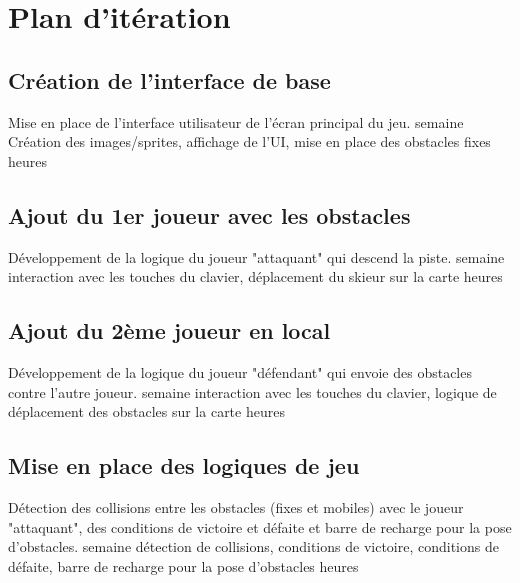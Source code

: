 \documentclass[a4paper,11pt]{article}
\begin{document}
	\newpage
	\section{Plan d'itération}
	
		\subsection{Création de l'interface de base}
			\begin{enumerate}[labelwidth=5em,leftmargin=8em]
				\objectif Mise en place de l'interface utilisateur de l'écran principal du jeu.
				 semaine
				\partageTache Création des images/sprites, affichage de l'UI, mise en place des obstacles fixes
				 heures
			\end{enumerate}
		\subsection{Ajout du 1er joueur avec les obstacles}
		\begin{enumerate}[labelwidth=5em,leftmargin=8em]
			\objectif Développement de la logique du joueur "attaquant" qui descend la piste.
			 semaine
			\partageTache interaction avec les touches du clavier, déplacement du skieur sur la carte
			 heures
		\end{enumerate}
		\subsection{Ajout du 2ème joueur en local}
		\begin{enumerate}[labelwidth=5em,leftmargin=8em]
			\objectif Développement de la logique du joueur "défendant" qui envoie des obstacles contre l'autre joueur.
			 semaine
			\partageTache interaction avec les touches du clavier, logique de déplacement des obstacles sur la carte
			 heures
		\end{enumerate}
		\subsection{Mise en place des logiques de jeu}
		\begin{enumerate}[labelwidth=5em,leftmargin=8em]
			\objectif Détection des collisions entre les obstacles (fixes et mobiles) avec le joueur "attaquant", des conditions de victoire et défaite et barre de recharge pour la pose d'obstacles.
			 semaine
			\partageTache détection de collisions, conditions de victoire, conditions de défaite, barre de recharge pour la pose d'obstacles
			 heures
		\end{enumerate}
\end{document}
